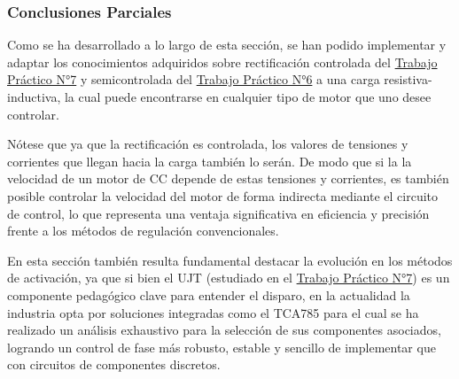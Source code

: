 \documentclass[12pt,a4paper]{article}
\begin{document}
\subsubsection{Conclusiones Parciales}
Como se ha desarrollado a lo largo de esta sección, se han podido implementar y adaptar los conocimientos adquiridos sobre rectificación controlada del \href{https://github.com/ErnestMonja/Electronica-Industrial/blob/main/TPT7%20%20%20-%20Circuito%20de%20Disparo%20para%20Tiristores/Monja.TPT7.EI2026.pdf}{Trabajo Práctico N°7} y semicontrolada del \href{https://github.com/ErnestMonja/Electronica-Industrial/blob/main/TPT6%20%20%20-%20Tiristores/Monja.TPT6.EI2026.pdf}{Trabajo Práctico N°6} a una carga resistiva-inductiva, la cual puede encontrarse en cualquier tipo de motor que uno desee controlar.

Nótese que ya que la rectificación es controlada, los valores de tensiones y corrientes que llegan hacia la carga también lo serán. De modo que si la la velocidad de un motor de CC depende de estas tensiones y corrientes, es también posible controlar la velocidad del motor de forma indirecta mediante el circuito de control, lo que representa una ventaja significativa en eficiencia y precisión frente a los métodos de regulación convencionales.

En esta sección también resulta fundamental destacar la evolución en los métodos de activación, ya que si bien el UJT (estudiado en el \href{https://github.com/ErnestMonja/Electronica-Industrial/blob/main/TPT7%20%20%20-%20Circuito%20de%20Disparo%20para%20Tiristores/Monja.TPT7.EI2026.pdf}{Trabajo Práctico N°7}) es un componente pedagógico clave para entender el disparo, en la actualidad la industria opta por soluciones integradas como el TCA785 para el cual se ha realizado un análisis exhaustivo para la selección de sus componentes asociados, logrando un control de fase más robusto, estable y sencillo de implementar que con circuitos de componentes discretos.
\end{document}
